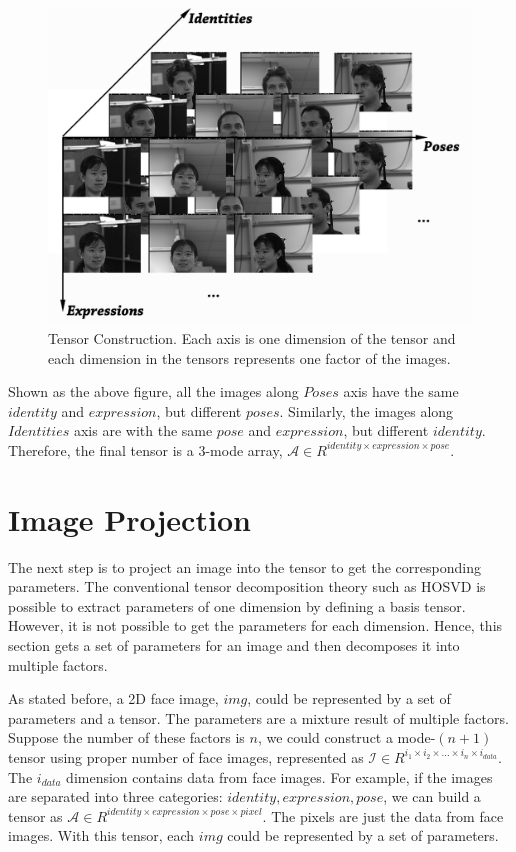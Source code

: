 \begin{figure}[!htb]
    \centering
	\includegraphics[scale = 0.75]{figure/tensor.png}
    \caption{Tensor Construction. Each axis is one dimension of the tensor 
    and each dimension in the tensors represents one factor of the images.}
    \label{fig:tensor}
\end{figure}

Shown as the above figure, all the images along $Poses$ axis have
the same $identity$ and $expression$, but different $poses$. Similarly,
the images along $Identities$ axis are with the same $pose$ and
$expression$, but different $identity$. Therefore, the final tensor is
a $3$-mode array, $\mathcal{A} \in R^{identity \times expression \times pose}$. 


  \section{Image Projection}
  The next step is to project an image into the tensor to get the corresponding
  parameters. The conventional tensor decomposition theory such as HOSVD 
  \cite{Lathauwer00} is possible to extract parameters of one dimension by 
  defining a basis tensor. However, it is not possible to get the parameters 
  for each dimension. Hence, this section gets a set of parameters for an image 
  and then decomposes it into multiple factors. 

  As stated before, a 2D face image, $img$, could be represented by a set of
  parameters and a tensor. The parameters are a mixture result of multiple factors. 
  Suppose the number of these factors is $n$, we could construct a mode-$(n+1)$ tensor
  using proper number of face images, represented as 
  $\mathcal{I} \in R^{i_1 \times i_2 \times ... \times i_n \times i_{data}}$.  
  The $i_{data}$ dimension contains data from face images. 
  For example, if the images are separated into three categories: $identity,expression,pose$, we can
  build a tensor as $\mathcal{A} \in R^{identity \times expression \times pose \times pixel}$. The pixels
  are just the data from face images. With this tensor, each $img$ could be represented by a set of
  parameters. 


